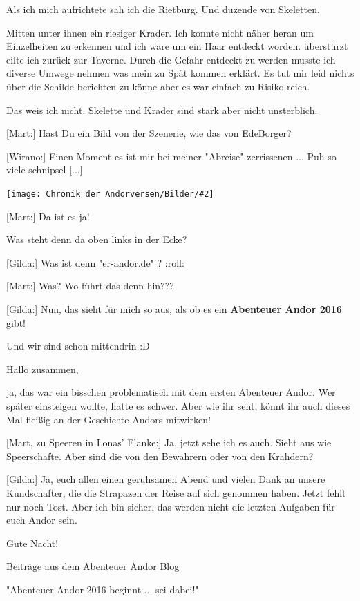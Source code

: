 \documentclass[10pt, a4paper, oneside]{book}
\newcommand{\bildmitts}[2][height=0.32\textwidth,width=0.48\textwidth,keepaspectratio]{%
    \begin{center}
        \texttt{[image: Chronik der Andorversen/Bilder/\#2]}
    \end{center}
}
\begin{document}
\begin{multicols}{2}
Als ich mich aufrichtete sah ich die Rietburg. Und duzende von Skeletten. 

Mitten unter ihnen ein riesiger Krader. Ich konnte nicht näher heran um Einzelheiten zu erkennen und ich wäre um ein Haar entdeckt worden. überstürzt eilte ich zurück zur Taverne. Durch die Gefahr entdeckt zu werden musste ich diverse Umwege nehmen was mein zu Spät kommen erklärt. Es tut mir leid nichts über die Schilde berichten zu könne aber es war einfach zu Risiko reich.

Das weis ich nicht. Skelette und Krader sind stark aber nicht unsterblich.

[Mart:] Hast Du ein Bild von der Szenerie, wie das von EdeBorger?

[Wirano:] Einen Moment es ist mir bei meiner "Abreise" zerrissenen ... Puh so viele schnipsel [...]

\bildmitts{AA2016 Treffen mit Mart und Juna 10.jpeg}

[Mart:] Da ist es ja!

Was steht denn da oben links in der Ecke?

[Gilda:] Was ist denn "er-andor.de" ? :roll:

[Mart:] Was? Wo führt das denn hin???

[Gilda:] Nun, das sieht für mich so aus, als ob es ein \textbf{Abenteuer Andor 2016} gibt!

Und wir sind schon mittendrin :D 

Hallo zusammen,

ja, das war ein bisschen problematisch mit dem ersten Abenteuer Andor. Wer später einsteigen wollte, hatte es schwer. Aber wie ihr seht, könnt ihr auch dieses Mal fleißig an der Geschichte Andors mitwirken!

[Mart, zu Speeren in Lonas’ Flanke:] Ja, jetzt sehe ich es auch. Sieht aus wie Speerschafte. Aber sind die von den Bewahrern oder von den Krahdern?

[Gilda:] Ja, euch allen einen geruhsamen Abend und vielen Dank an unsere Kundschafter, die die Strapazen der Reise auf sich genommen haben. Jetzt fehlt nur noch Tost. Aber ich bin sicher, das werden nicht die letzten Aufgaben für euch Andor sein.

Gute Nacht!



\begin{center}
    Beiträge aus dem Abenteuer Andor Blog

    "Abenteuer Andor 2016 beginnt ... sei dabei!"


\end{center}
\end{multicols}
\end{document}
